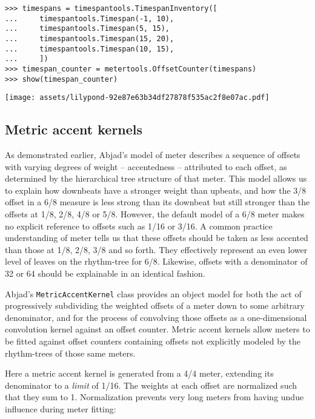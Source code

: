 \begin{abjadbookoutput}
\begin{singlespacing}
\vspace{-0.5\baselineskip}
\begin{verbatim}
>>> timespans = timespantools.TimespanInventory([
...     timespantools.Timespan(-1, 10),
...     timespantools.Timespan(5, 15),
...     timespantools.Timespan(15, 20),
...     timespantools.Timespan(10, 15),
...     ])
>>> timespan_counter = metertools.OffsetCounter(timespans)
>>> show(timespan_counter)
\end{verbatim}
\noindent\texttt{[image: assets/lilypond-92e87e63b34df27878f535ac2f8e07ac.pdf]}
\end{singlespacing}
\end{abjadbookoutput}

\subsection{Metric accent kernels} %

As demonstrated earlier, Abjad's model of meter describes a sequence of offsets
with varying degrees of weight -- accentedness -- attributed to each offset, as
determined by the hierarchical tree structure of that meter. This model allows
us to explain how downbeats have a stronger weight than upbeats, and how the
3/8 offset in a 6/8 measure is less strong than its downbeat but still stronger
than the offsets at 1/8, 2/8, 4/8 or 5/8. However, the default model of a 6/8
meter makes no explicit reference to offsets such as 1/16 or 3/16. A common
practice understanding of meter tells us that these offsets should be taken as
less accented than those at 1/8, 2/8, 3/8 and so forth. They effectively
represent an even lower level of leaves on the rhythm-tree for 6/8. Likewise,
offsets with a denominator of 32 or 64 should be explainable in an identical
fashion.

Abjad's \texttt{MetricAccentKernel} class provides an object model for both the
act of progressively subdividing the weighted offsets of a meter down to some
arbitrary denominator, and for the process of convolving those offsets as a
one-dimensional convolution kernel against an offset counter. Metric accent
kernels allow meters to be fitted against offset counters containing offsets
not explicitly modeled by the rhythm-trees of those same meters.

Here a metric accent kernel is generated from a 4/4 meter, extending its
denominator to a \emph{limit} of 1/16. The weights at each offset are
normalized such that they sum to 1. Normalization prevents very long meters
from having undue influence during meter fitting:

